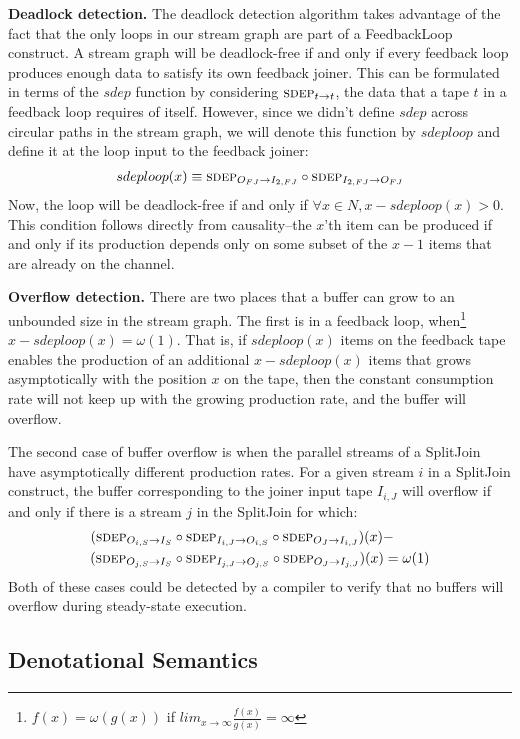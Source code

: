 {\bf Deadlock detection.}  The deadlock detection algorithm takes
advantage of the fact that the only loops in our stream graph are part
of a FeedbackLoop construct.  A stream graph will be deadlock-free if
and only if every feedback loop produces enough data to satisfy its
own feedback joiner.  This can be formulated in terms of the $sdep$
function by considering $\mi{t}{t}$, the data that a tape $t$ in a
feedback loop requires of itself.  However, since we didn't define
$sdep$ across circular paths in the stream graph, we will denote this
function by $sdeploop$ and define it at the loop input to the feedback
joiner:
\begin{align*}
sdeploop(x) \equiv \mi{I_{2,FJ}}{O_{FJ}} \circ \mi{O_{FJ}}{I_{2,FJ}}
\end{align*}
Now, the loop will be deadlock-free if and only if $\forall x \in N, x
- sdeploop(x) > 0$.  This condition follows directly from
causality--the $x$'th item can be produced if and only if its
production depends only on some subset of the $x-1$ items that are
already on the channel.

{\bf Overflow detection.}  There are two places that a buffer can grow
to an unbounded size in the stream graph.  The first is in a feedback
loop, when\footnote{$f(x) = \omega(g(x))$ if $lim_{x \rightarrow
\infty}\frac{f(x)}{g(x)} = \infty$}~$x - sdeploop(x) = \omega(1)$.
That is, if $sdeploop(x)$ items on the feedback tape enables the
production of an additional $x - sdeploop(x)$ items that grows
asymptotically with the position $x$ on the tape, then the constant
consumption rate will not keep up with the growing production rate,
and the buffer will overflow.

The second case of buffer overflow is when the parallel streams of a
SplitJoin have asymptotically different production rates.  For a given
stream $i$ in a SplitJoin construct, the buffer corresponding to the
joiner input tape $I_{i,J}$ will overflow if and only if there is a
stream $j$ in the SplitJoin for which:
\begin{align*}
(\mi{I_S}{O_{i,S}}& \circ \mi{O_{i,S}}{I_{i,J}} \circ \mi{I_{i,J}}{O_J})(x) - \\
(\mi{I_S}{O_{j,S}}& \circ \mi{O_{j,S}}{I_{j,J}} \circ \mi{I_{j,J}}{O_J})(x) = \omega(1)
\end{align*}
Both of these cases could be detected by a compiler to verify that no
buffers will overflow during steady-state execution.

\subsection{Denotational Semantics}
\label{sec:denotational}

